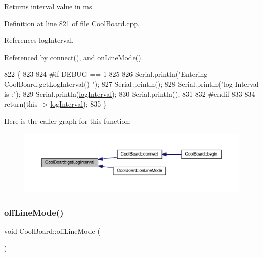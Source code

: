 \begin{DoxyReturn}{Returns}
interval value in ms 
\end{DoxyReturn}


Definition at line 821 of file Cool\+Board.\+cpp.



References log\+Interval.



Referenced by connect(), and on\+Line\+Mode().


\begin{DoxyCode}
822 \{
823 
824 \textcolor{preprocessor}{#if DEBUG == 1}
825 
826     Serial.println(\textcolor{stringliteral}{"Entering CoolBoard.getLogInterval() "});
827     Serial.println();
828     Serial.println(\textcolor{stringliteral}{"log Interval is :"});
829     Serial.println(\hyperlink{classCoolBoard_a4de0096d575d66b472c4c1f0111fd452}{logInterval});
830     Serial.println();
831 
832 \textcolor{preprocessor}{#endif}
833 
834     \textcolor{keywordflow}{return}(\textcolor{keyword}{this} -> \hyperlink{classCoolBoard_a4de0096d575d66b472c4c1f0111fd452}{logInterval});
835 \}
\end{DoxyCode}
Here is the caller graph for this function\+:
\nopagebreak
\begin{figure}[H]
\begin{center}
\leavevmode
\includegraphics[width=350pt]{classCoolBoard_aaa24480b273fc095a1356a589c333781_icgraph}
\end{center}
\end{figure}
\mbox{\label{classCoolBoard_ae6b5e1274d760462290192acea4adca8}} 
\subsubsection{\texorpdfstring{off\+Line\+Mode()}{offLineMode()}}
{\footnotesize\ttfamily void Cool\+Board\+::off\+Line\+Mode (\begin{DoxyParamCaption}{ }\end{DoxyParamCaption})}


